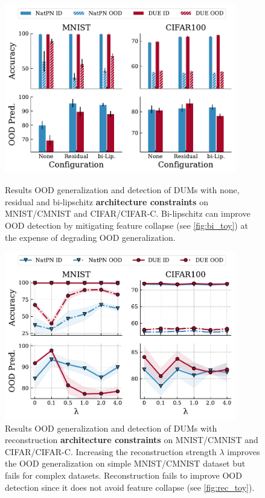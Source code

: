 \begin{figure}
\begin{minipage}[t]{0.48\textwidth}
    \centering
    \includegraphics[width=0.9\textwidth]{sections/008_iclr2023/figures/bi_bar_short.pdf}
    \caption{Results OOD generalization and detection of DUMs with none, residual and bi-lipschitz \textbf{architecture constraints} on MNIST/CMNIST and CIFAR/CIFAR-C. Bi-lipschitz can improve OOD detection by mitigating feature collapse (see \cref{fig:bi_toy}) at the expense of degrading OOD generalization.}
    \label{fig:bi}
\end{minipage}\quad%
%
\begin{minipage}[t]{0.48\textwidth}
    \centering
    \includegraphics[width=0.9\textwidth]{sections/008_iclr2023/figures/reconst_short.pdf}
    \caption{Results OOD generalization and detection of DUMs with reconstruction \textbf{architecture constraints} on MNIST/CMNIST and CIFAR/CIFAR-C. Increasing the reconstruction strength $\lambda$ improves the OOD generalization on simple MNIST/CMNIST dataset but fails for complex datasets. Reconstruction fails to improve OOD detection since it does not avoid feature collapse (see \cref{fig:rec_toy}). }
    \label{fig:rec}
\end{minipage}
\end{figure}
